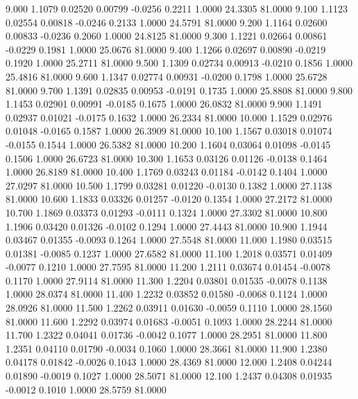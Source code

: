    9.000   1.1079   0.02520   0.00799  -0.0256   0.2211   1.0000  24.3305  81.0000
   9.100   1.1123   0.02554   0.00818  -0.0246   0.2133   1.0000  24.5791  81.0000
   9.200   1.1164   0.02600   0.00833  -0.0236   0.2060   1.0000  24.8125  81.0000
   9.300   1.1221   0.02664   0.00861  -0.0229   0.1981   1.0000  25.0676  81.0000
   9.400   1.1266   0.02697   0.00890  -0.0219   0.1920   1.0000  25.2711  81.0000
   9.500   1.1309   0.02734   0.00913  -0.0210   0.1856   1.0000  25.4816  81.0000
   9.600   1.1347   0.02774   0.00931  -0.0200   0.1798   1.0000  25.6728  81.0000
   9.700   1.1391   0.02835   0.00953  -0.0191   0.1735   1.0000  25.8808  81.0000
   9.800   1.1453   0.02901   0.00991  -0.0185   0.1675   1.0000  26.0832  81.0000
   9.900   1.1491   0.02937   0.01021  -0.0175   0.1632   1.0000  26.2334  81.0000
  10.000   1.1529   0.02976   0.01048  -0.0165   0.1587   1.0000  26.3909  81.0000
  10.100   1.1567   0.03018   0.01074  -0.0155   0.1544   1.0000  26.5382  81.0000
  10.200   1.1604   0.03064   0.01098  -0.0145   0.1506   1.0000  26.6723  81.0000
  10.300   1.1653   0.03126   0.01126  -0.0138   0.1464   1.0000  26.8189  81.0000
  10.400   1.1769   0.03243   0.01184  -0.0142   0.1404   1.0000  27.0297  81.0000
  10.500   1.1799   0.03281   0.01220  -0.0130   0.1382   1.0000  27.1138  81.0000
  10.600   1.1833   0.03326   0.01257  -0.0120   0.1354   1.0000  27.2172  81.0000
  10.700   1.1869   0.03373   0.01293  -0.0111   0.1324   1.0000  27.3302  81.0000
  10.800   1.1906   0.03420   0.01326  -0.0102   0.1294   1.0000  27.4443  81.0000
  10.900   1.1944   0.03467   0.01355  -0.0093   0.1264   1.0000  27.5548  81.0000
  11.000   1.1980   0.03515   0.01381  -0.0085   0.1237   1.0000  27.6582  81.0000
  11.100   1.2018   0.03571   0.01409  -0.0077   0.1210   1.0000  27.7595  81.0000
  11.200   1.2111   0.03674   0.01454  -0.0078   0.1170   1.0000  27.9114  81.0000
  11.300   1.2204   0.03801   0.01535  -0.0078   0.1138   1.0000  28.0374  81.0000
  11.400   1.2232   0.03852   0.01580  -0.0068   0.1124   1.0000  28.0926  81.0000
  11.500   1.2262   0.03911   0.01630  -0.0059   0.1110   1.0000  28.1560  81.0000
  11.600   1.2292   0.03974   0.01683  -0.0051   0.1093   1.0000  28.2244  81.0000
  11.700   1.2322   0.04041   0.01736  -0.0042   0.1077   1.0000  28.2951  81.0000
  11.800   1.2351   0.04110   0.01790  -0.0034   0.1060   1.0000  28.3661  81.0000
  11.900   1.2380   0.04178   0.01842  -0.0026   0.1043   1.0000  28.4369  81.0000
  12.000   1.2408   0.04244   0.01890  -0.0019   0.1027   1.0000  28.5071  81.0000
  12.100   1.2437   0.04308   0.01935  -0.0012   0.1010   1.0000  28.5759  81.0000
